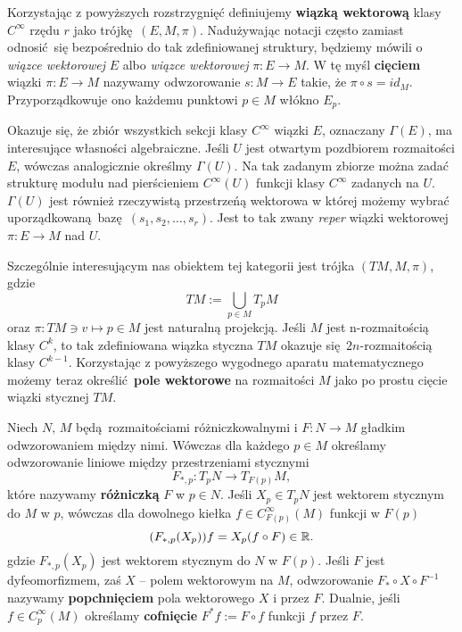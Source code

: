 Korzystając z powyższych rozstrzygnięć definiujemy \textbf{wiązką wektorową} klasy \(C^\infty\) rzędu \(r\) jako trójkę \((E, M, \pi)\). Nadużywając notacji często zamiast odnosić się bezpośrednio do tak zdefiniowanej struktury, będziemy mówili o \emph{wiązce wektorowej} \(E\) albo \emph{wiązce wektorowej} \(\pi:E\to M\). W tę myśl \textbf{cięciem} wiązki \(\pi: E\to M\) nazywamy odwzorowanie \(s:M\to E\) takie, że \(\pi\circ s= id_M\). Przyporządkowuje ono każdemu punktowi \(p\in M\) włókno \(E_p\). 

Okazuje się, że zbiór wszystkich sekcji klasy \(C^\infty\) wiązki \(E\), oznaczany \(\Gamma(E)\), ma interesujące własności algebraiczne. Jeśli \(U\) jest otwartym pozdbiorem rozmaitości \(E\), wówczas analogicznie określmy \(\Gamma(U)\). Na tak zadanym zbiorze można zadać strukturę modułu nad pierścieniem \(C^\infty(U)\) funkcji klasy \(C^\infty\) zadanych na \(U\). \(\Gamma(U)\) jest również rzeczywistą przestrzeńą wektorowa w której możemy wybrać uporządkowaną bazę \((s_1, s_2, \dots, s_r)\). Jest to tak zwany \emph{reper} wiązki wektorowej \(\pi:E\to M\) nad \(U\). 

Szczególnie interesującym nas obiektem tej kategorii jest trójka \((TM, M, \pi)\), gdzie 
\begin{equation*}
TM := \bigcup\limits_{p\in M} T_p M
\end{equation*}
oraz \(\pi: TM \ni v \mapsto p\in M\) jest naturalną projekcją. Jeśli \(M\) jest n-rozmaitością klasy \(C^k\), to tak zdefiniowana wiązka styczna \(TM\) okazuje się \(2n\)-rozmaitością klasy \(C^{k-1}\).  Korzystając z powyższego wygodnego aparatu matematycznego możemy teraz określić \textbf{pole wektorowe} na rozmaitości \(M\) jako po prostu cięcie wiązki stycznej \(TM\).

Niech \(N,\,M\) będą rozmaitościami różniczkowalnymi i \(F:N\to M\) gładkim odwzorowaniem między nimi. Wówczas dla każdego \(p\in M\) określamy odwzorowanie liniowe między przestrzeniami stycznymi 
\begin{equation}
F_{\ast, p}:T_p N\rightarrow T_{F(p)}M, 
\end{equation}
które nazywamy \textbf{różniczką} \(F\) w \(p\in N\). Jeśli \(X_p\in T_p N\) jest wektorem stycznym do \(M\) w \(p\), wówczas dla dowolnego kiełka \(f\in C_{F(p)}^\infty(M)\) funkcji w \(F(p)\) 
\begin{equation}
(F_{\ast, p} (X_p))f = X_p(f\circ F) \in \mathbb{R}.
\end{equation} 
gdzie \(F_{\ast, p} (X_p)\) jest wektorem stycznym do \(N\) w \(F(p)\). Jeśli \(F\) jest dyfeomorfizmem, zaś \(X\) -- polem wektorowym na \(M\), odwzorowanie \(F_\ast \circ X \circ F^{-1}\) nazywamy \textbf{popchnięciem} pola wektorowego \(X\) i przez \(F\). Dualnie, jeśli \(f\in C_p^\infty(M)\) określamy \textbf{cofnięcie} \(F^\ast f := F\circ f\) funkcji \(f\) przez \(F\).

